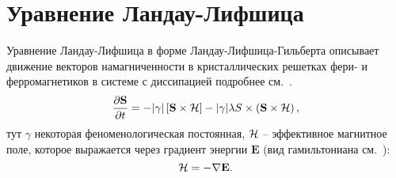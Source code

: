 \section{Уравнение Ландау-Лифшица}

Уравнение Ландау-Лифшица в форме Ландау-Лифшица-Гильберта описывает движение
векторов намагниченности в кристаллических решетках фери- и ферромагнетиков в
системе с диссипацией подробнее см.~\cite{lan-lif-again}.
\begin{equation}\label{eq:lan-lif-full}
    \frac{\partial \mathbf{S}}{\partial t} = - |\gamma|\left[\mathbf{S}\times
    \mathcal{H}\right]-
    |\gamma|\lambda S \times \left( \mathbf S \times \mathcal{H} \right),
\end{equation}
тут $\gamma$ некоторая феноменологическая постоянная,
$\mathcal{H}$ -- эффективное магнитное поле, которое выражается через градиент
энергии $\mathbf E$ (вид гамильтониана см.~\cite[с. 2]{Hagemeister2015}):
\begin{equation}
    \mathcal{H} = -\nabla \mathbf{E} \label{eq:heff-def}.
\end{equation}

